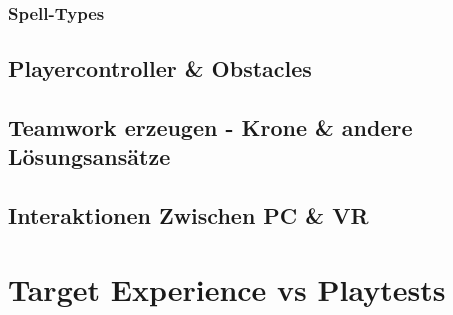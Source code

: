 \subsubsection{Spell-Types}

\subsection{Playercontroller \& Obstacles}

\subsection{Teamwork erzeugen - Krone \& andere Lösungsansätze\label{_teamwork_erzeugen}}

\subsection{Interaktionen Zwischen PC \& VR}

\section{Target Experience vs Playtests}
